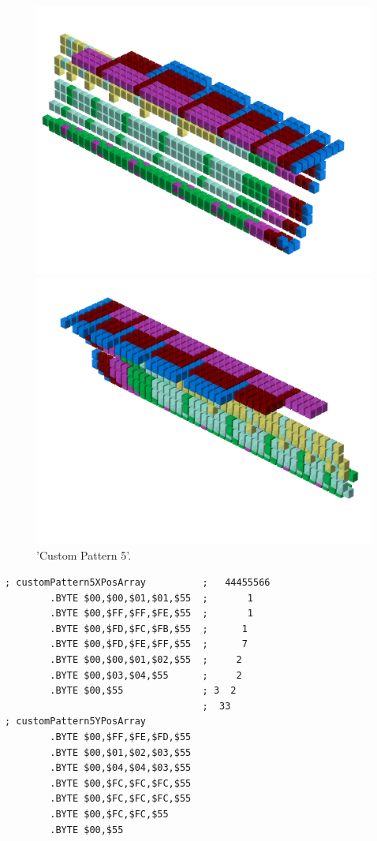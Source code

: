 \begin{figure}[H]
    \centering
    \begin{adjustbox}{width=12cm,center}
      \includegraphics[width=12cm]{src/patterns/pattern13-45.png}%
    \end{adjustbox}
    \begin{adjustbox}{width=12cm,margin=0cm -4cm}
      \includegraphics[width=12cm]{src/patterns/pattern13-225.png}%
    \end{adjustbox}
\caption{'Custom Pattern 5'.}
\end{figure}
\clearpage

\begin{lstlisting}
; customPattern5XPosArray          ;   44455566
        .BYTE $00,$00,$01,$01,$55  ;       1   
        .BYTE $00,$FF,$FF,$FE,$55  ;       1   
        .BYTE $00,$FD,$FC,$FB,$55  ;      1    
        .BYTE $00,$FD,$FE,$FF,$55  ;      7    
        .BYTE $00,$00,$01,$02,$55  ;     2     
        .BYTE $00,$03,$04,$55      ;     2     
        .BYTE $00,$55              ; 3  2      
                                   ;  33       
; customPattern5YPosArray
        .BYTE $00,$FF,$FE,$FD,$55
        .BYTE $00,$01,$02,$03,$55
        .BYTE $00,$04,$04,$03,$55
        .BYTE $00,$FC,$FC,$FC,$55
        .BYTE $00,$FC,$FC,$FC,$55
        .BYTE $00,$FC,$FC,$55
        .BYTE $00,$55
\end{lstlisting}


